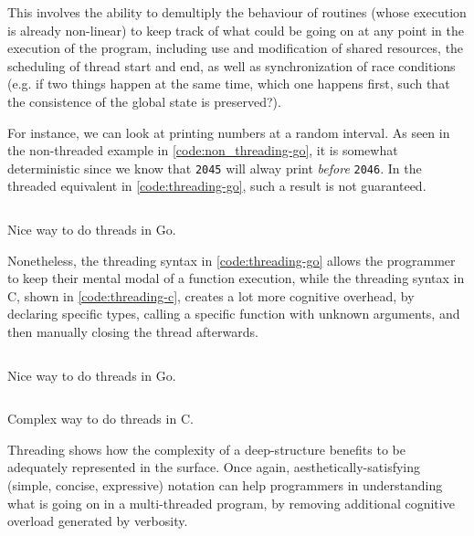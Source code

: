 This involves the ability to demultiply the behaviour of routines (whose execution is already non-linear) to keep track of what could be going on at any point in the execution of the program, including use and modification of shared resources, the scheduling of thread start and end, as well as synchronization of race conditions (e.g. if two things happen at the same time, which one happens first, such that the consistence of the global state is preserved?).

For instance, we can look at printing numbers at a random interval. As seen in the non-threaded example in \ref{code:non_threading-go}, it is somewhat deterministic since we know that \lstinline{2045} will alway print \emph{before} \lstinline{2046}. In the threaded equivalent in \ref{code:threading-go}, such a result is not guaranteed.

\begin{listing}
  \inputminted{python}{./corpus/non_thread.go}
  \caption{Nice way to do threads in Go.}
  \label{code:non_threading-go}
\end{listing}

Nonetheless, the threading syntax in \ref{code:threading-go} allows the programmer to keep their mental modal of a function execution, while the threading syntax in C, shown in \ref{code:threading-c}, creates a lot more cognitive overhead, by declaring specific types, calling a specific function with unknown arguments, and then manually closing the thread afterwards.

\begin{listing}
  \inputminted{python}{./corpus/thread.go}
  \caption{Nice way to do threads in Go.}
  \label{code:threading-go}
\end{listing}

\begin{listing}
  \inputminted{python}{./corpus/thread.c}
  \caption{Complex way to do threads in C.}
  \label{code:threading-c}
\end{listing}

Threading shows how the complexity of a deep-structure benefits to be adequately represented in the surface. Once again, aesthetically-satisfying (simple, concise, expressive) notation can help programmers in understanding what is going on in a multi-threaded program, by removing additional cognitive overload generated by verbosity.

